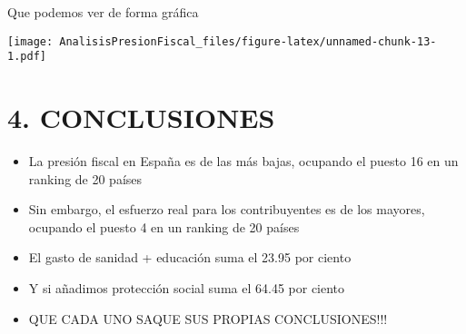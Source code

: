 \documentclass[
]{article}
\begin{document}
Que podemos ver de forma gráfica

\texttt{[image: AnalisisPresionFiscal\_files/figure-latex/unnamed-chunk-13-1.pdf]}

\hypertarget{conclusiones}{%
\section{4. CONCLUSIONES}\label{conclusiones}}

\begin{itemize}
\item
  La presión fiscal en España es de las más bajas, ocupando el puesto 16
  en un ranking de 20 países
\item
  Sin embargo, el esfuerzo real para los contribuyentes es de los
  mayores, ocupando el puesto 4 en un ranking de 20 países
\item
  El gasto de sanidad + educación suma el 23.95 por ciento
\item
  Y si añadimos protección social suma el 64.45 por ciento
\item
  QUE CADA UNO SAQUE SUS PROPIAS CONCLUSIONES!!!
\end{itemize}
\end{document}
